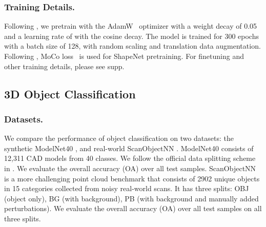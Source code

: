 \documentclass[runningheads]{llncs}
\begin{document}
\subsubsection{Training Details.} Following \cite{yu2021point}, we pretrain with the AdamW~\cite{loshchilov2017decoupled} optimizer with a weight decay of 0.05 and a learning rate of  with the cosine decay. The model is trained for 300 epochs with a batch size of 128, with random scaling and translation data augmentation.  Following \cite{yu2021point}, MoCo loss~\cite{he2020momentum} is used for ShapeNet pretraining. For finetuning and other training details, please see supp.

\subsection{3D Object Classification}
\subsubsection{Datasets.}
We compare the performance of object classification on two datasets: the synthetic ModelNet40 \cite{wu20153d}, and real-world ScanObjectNN \cite{uy2019revisiting}.
ModelNet40 \cite{wu20153d} consists of 12,311 CAD models from 40 classes. We follow the official data splitting scheme in \cite{wu20153d}. We evaluate the overall accuracy (OA)  over all test samples.
ScanObjectNN~\cite{uy2019revisiting} is a more challenging point cloud benchmark that consists of 2902 unique objects in 15 categories collected from noisy real-world scans.  It has three splits: OBJ (object only), BG (with background), PB (with background and manually added perturbations). We evaluate the overall accuracy (OA) over all test samples on all three splits.
\end{document}
